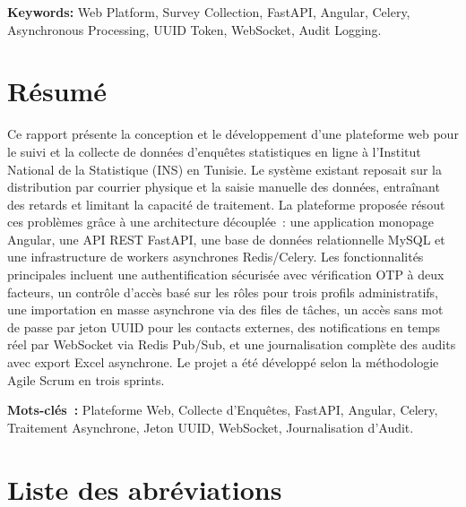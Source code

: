 \documentclass[12pt,a4paper]{report}
\begin{document}
\textbf{Keywords:} Web Platform, Survey Collection, FastAPI, Angular, Celery, Asynchronous Processing, UUID Token, WebSocket, Audit Logging.

\vspace{1.5cm}

\chapter*{Résumé}

Ce rapport présente la conception et le développement d'une plateforme web pour le suivi et la collecte de données d'enquêtes statistiques en ligne à l'Institut National de la Statistique (INS) en Tunisie. Le système existant reposait sur la distribution par courrier physique et la saisie manuelle des données, entraînant des retards et limitant la capacité de traitement. La plateforme proposée résout ces problèmes grâce à une architecture découplée~: une application monopage Angular, une API REST FastAPI, une base de données relationnelle MySQL et une infrastructure de workers asynchrones Redis/Celery. Les fonctionnalités principales incluent une authentification sécurisée avec vérification OTP à deux facteurs, un contrôle d'accès basé sur les rôles pour trois profils administratifs, une importation en masse asynchrone via des files de tâches, un accès sans mot de passe par jeton UUID pour les contacts externes, des notifications en temps réel par WebSocket via Redis Pub/Sub, et une journalisation complète des audits avec export Excel asynchrone. Le projet a été développé selon la méthodologie Agile Scrum en trois sprints.

\textbf{Mots-clés~:} Plateforme Web, Collecte d'Enquêtes, FastAPI, Angular, Celery, Traitement Asynchrone, Jeton UUID, WebSocket, Journalisation d'Audit.

\clearpage
\tableofcontents
{}

\clearpage
\listoffigures
{}

\clearpage
\listoftables
{}

\clearpage
\chapter*{Liste des abréviations}
\end{document}
